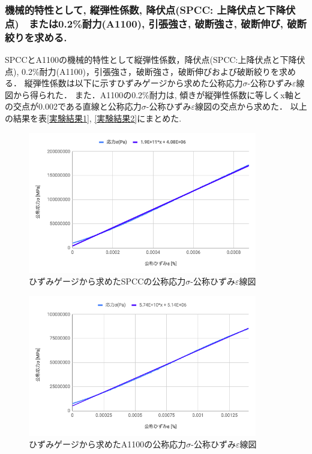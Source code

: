 \documentclass[a4paper,11pt,uplatex]{jsarticle}
\begin{document}
\subsubsection{機械的特性として, 縦弾性係数, 降伏点(SPCC: 上降伏点と下降伏点)　または0.2\%耐力(A1100), 引張強さ, 破断強さ, 破断伸び, 破断絞りを求める.}
SPCCとA1100の機械的特性として縦弾性係数，降伏点(SPCC:上降伏点と下降伏点), 0.2\%耐力(A1100)，引張強さ，破断強さ，破断伸びおよび破断絞りを求める．
縦弾性係数は以下に示すひずみゲージから求めた公称応力$\sigma$-公称ひずみ$\varepsilon$線図から得られた．
また．A1100の0.2\%耐力は, 傾きが縦弾性係数に等しくx軸との交点が0.002である直線と公称応力$\sigma$-公称ひずみ$\varepsilon$線図の交点から求めた．
以上の結果を表\ref{実験結果1}, \ref{実験結果2}にまとめた.

\begin{figure}[H]
      \begin{center}
        \includegraphics[width = 10cm]{画像/SPCCひずみゲージ.png}
        \caption{ひずみゲージから求めたSPCCの公称応力$\sigma$-公称ひずみ$\varepsilon$線図}
        \label{SPCCひずみゲージ}
      \end{center}
\end{figure}

\begin{figure}[H]
      \begin{center}
        \includegraphics[width = 10cm]{画像/A1100ひずみゲージ.png}
        \caption{ひずみゲージから求めたA1100の公称応力$\sigma$-公称ひずみ$\varepsilon$線図}
        \label{A1100ひずみゲージ}
      \end{center}
\end{figure}
\end{document}
